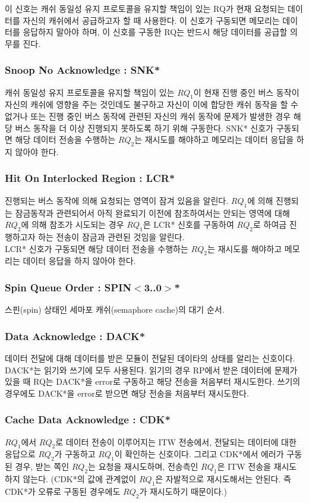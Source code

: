 이 신호는 캐쉬 동일성 유지 프로토콜을 유지할 책임이 있는 RQ가 현재 요청되는
데이터를 자신의 캐쉬에서 공급하고자 할 때 사용한다. 이 신호가 구동되면 메모리는 데이터를
응답하지 말아야 하며, 이 신호를 구동한 RQ는 반드시 해당 데이터를 공급할 의무를 진다.

%
\subsubsection{Snoop No Acknowledge : SNK*}
캐쉬 동일성 유지 프로토콜을 유지할 책임이 있는 $RQ_1$이 현재 진행 중인
버스 동작이 자신의 캐쉬에 영향을 주는 것인데도 불구하고 자신이 이에 합당한 캐쉬 동작을
할 수 없거나 또는 진행 중인 버스 동작에 관련된 자신의 캐쉬 동작에 문제가 발생한 경우
해당 버스 동작을 더 이상 진행되지 못하도록 하기 위해 구동한다.
SNK* 신호가 구동되면 해당 데이터 전송을 수행하는 $RQ_2$는 재시도를 해야하고
메모리는 데이터 응답을 하지 않아야 한다.

%
\subsubsection{Hit On Interlocked Region : LCR*}
진행되는 버스 동작에 의해 요청되는 영역이 잠겨 있음을 알린다.
$RQ_1$에 의해 진행되는 잠금동작과 관련되어서 아직 완료되기 이전에
참조하여서는 안되는 영역에 대해 $RQ_2$에 의해 참조가 시도되는 경우 
$RQ_1$은 LCR* 신호를 구동하여 $RQ_2$로 하여금 진행하고자 하는
전송이 잠금과 관련된 것임을 알린다. \\
LCR* 신호가 구동되면 해당 데이터 전송을 수행하는 $RQ_2$는 재시도를 해야하고
메모리는 데이터 응답을 하지 않아야 한다.

%
\subsubsection{Spin Queue Order : SPIN$<$3..0$>$*}
스핀(spin) 상태인 세마포 캐쉬(semaphore cache)의 대기 순서.
%
\subsubsection{Data Acknowledge : DACK*}
데이터 전달에 대해 데이터를 받은 모듈이 전달된 데이타의 상태를 알리는 신호이다.
DACK*는 읽기와 쓰기에 모두 사용된다. 읽기의 경우 RP에서 받은 데이터에 문제가
있을 때 RQ는 DACK*을 error로 구동하고 해당 전송을 처음부터 재시도한다.
쓰기의 경우에도 DACK*을 error로 받으면 해당 전송을 처음부터 재시도한다.

%
\subsubsection{Cache Data Acknowledge : CDK*}
$RQ_1$에서 $RQ_2$로 데이터 전송이 이루어지는 ITW 전송에서,
전달되는 데이터에 대한 응답으로 $RQ_2$가 구동하고 $RQ_1$이 확인하는 신호이다.
그리고 CDK*에서 에러가 구동된 경우, 받는 쪽인 $RQ_2$는 요청을 재시도하며,
전송측인 $RQ_1$은 ITW 전송을 재시도하지 않는다. (CDK*의 값에 관계없이
$RQ_1$은 자발적으로 재시도해서는 안된다. 즉 CDK*가 오류로 구동된 경우에도
$RQ_2$가 재시도하기 때문이다.)

%
